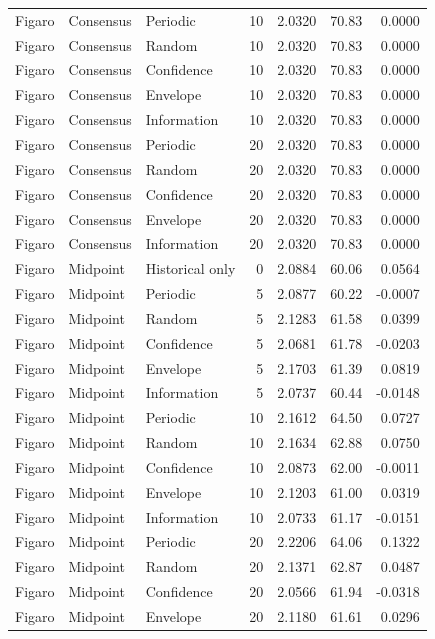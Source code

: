 \begin{longtable}{lllrrrr}
Figaro & Consensus & Periodic & 10 & 2.0320 & 70.83 & 0.0000 \\
Figaro & Consensus & Random & 10 & 2.0320 & 70.83 & 0.0000 \\
Figaro & Consensus & Confidence & 10 & 2.0320 & 70.83 & 0.0000 \\
Figaro & Consensus & Envelope & 10 & 2.0320 & 70.83 & 0.0000 \\
Figaro & Consensus & Information & 10 & 2.0320 & 70.83 & 0.0000 \\
Figaro & Consensus & Periodic & 20 & 2.0320 & 70.83 & 0.0000 \\
Figaro & Consensus & Random & 20 & 2.0320 & 70.83 & 0.0000 \\
Figaro & Consensus & Confidence & 20 & 2.0320 & 70.83 & 0.0000 \\
Figaro & Consensus & Envelope & 20 & 2.0320 & 70.83 & 0.0000 \\
Figaro & Consensus & Information & 20 & 2.0320 & 70.83 & 0.0000 \\
Figaro & Midpoint & Historical only & 0 & 2.0884 & 60.06 & 0.0564 \\
Figaro & Midpoint & Periodic & 5 & 2.0877 & 60.22 & -0.0007 \\
Figaro & Midpoint & Random & 5 & 2.1283 & 61.58 & 0.0399 \\
Figaro & Midpoint & Confidence & 5 & 2.0681 & 61.78 & -0.0203 \\
Figaro & Midpoint & Envelope & 5 & 2.1703 & 61.39 & 0.0819 \\
Figaro & Midpoint & Information & 5 & 2.0737 & 60.44 & -0.0148 \\
Figaro & Midpoint & Periodic & 10 & 2.1612 & 64.50 & 0.0727 \\
Figaro & Midpoint & Random & 10 & 2.1634 & 62.88 & 0.0750 \\
Figaro & Midpoint & Confidence & 10 & 2.0873 & 62.00 & -0.0011 \\
Figaro & Midpoint & Envelope & 10 & 2.1203 & 61.00 & 0.0319 \\
Figaro & Midpoint & Information & 10 & 2.0733 & 61.17 & -0.0151 \\
Figaro & Midpoint & Periodic & 20 & 2.2206 & 64.06 & 0.1322 \\
Figaro & Midpoint & Random & 20 & 2.1371 & 62.87 & 0.0487 \\
Figaro & Midpoint & Confidence & 20 & 2.0566 & 61.94 & -0.0318 \\
Figaro & Midpoint & Envelope & 20 & 2.1180 & 61.61 & 0.0296 \\

\end{longtable}
